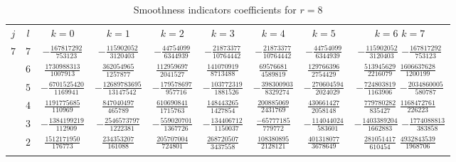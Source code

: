 \begin{table}
  \begin{center}
    \caption{Smoothness indicators coefficients for $r=8$}
    \label{tab:IS_8}
    \begin{tabular}{ccccccccc}
      \toprule
      $j$  &  $l$  &  $k=0$                            &  $k=1$                            &  $k=2$                            &  $k=3$                           &  $k=4$                           &  $k=5$                            &  $k=6$                            $k=7$                           \\ \addlinespace
      $7$  &  $7$  &  $-\frac{  167817292}{ 753123} $  &  $-\frac{  115902052}{ 3120403}$  &  $-\frac{  44754099}{ 6344939} $  &  $-\frac{  21873377}{10764442}$  &  $-\frac{  21873377}{10764442}$  &  $-\frac{  44754099}{ 6344939} $  &  $-\frac{  115902052}{ 3120403}$  $-\frac{  167817292}{ 753123}$  \\ \addlinespace
           &  $6$  &  $ \frac{ 1730988313}{1007913} $  &  $ \frac{  362054965}{ 1257877}$  &  $ \frac{ 112959697}{ 2041527} $  &  $ \frac{ 141070919}{ 8713488}$  &  $ \frac{  69576681}{ 4589819}$  &  $ \frac{ 129766396}{ 2754429} $  &  $ \frac{  513945629}{ 2216079}$  $ \frac{ 1606637628}{1200199}$  \\ \addlinespace
           &  $5$  &  $-\frac{ 6701525420}{1169941} $  &  $-\frac{12689783695}{13147542}$  &  $-\frac{ 179578697}{  957716} $  &  $-\frac{ 103772319}{ 1881526}$  &  $-\frac{ 398300903}{ 8329274}$  &  $-\frac{ 270604594}{ 2024029} $  &  $-\frac{  724803819}{ 1163906}$  $-\frac{ 2034860005}{ 580787}$  \\ \addlinespace
           &  $4$  &  $ \frac{ 1191775685}{ 110969} $  &  $ \frac{  847040497}{  465789}$  &  $ \frac{ 610690841}{ 1715763} $  &  $ \frac{ 148443265}{ 1427854}$  &  $ \frac{ 200885069}{ 2431769}$  &  $ \frac{ 430661427}{ 2058148} $  &  $ \frac{  779780282}{  835427}$  $ \frac{ 1168472761}{ 226223}$  \\ \addlinespace
           &  $3$  &  $-\frac{ 1384199219}{ 112909} $  &  $-\frac{ 2546573797}{ 1222381}$  &  $-\frac{ 559020701}{ 1367726} $  &  $-\frac{ 134406712}{ 1150037}$  &  $ \frac{ -65777185}{  779772}$  &  $-\frac{ 114044024}{  583601} $  &  $-\frac{ 1403389204}{ 1662883}$  $-\frac{ 1774088813}{ 383858}$  \\ \addlinespace
           &  $2$  &  $ \frac{ 1512171950}{ 176773} $  &  $ \frac{  234353207}{  161088}$  &  $ \frac{ 205707004}{  724801} $  &  $ \frac{ 268720507}{ 3437558}$  &  $ \frac{ 108380895}{ 2128121}$  &  $ \frac{ 401318077}{ 3678649} $  &  $ \frac{  281051417}{  610454}$  $ \frac{ 4932843539}{1968706}$  \\ \addlinespace

\end{tabular}
\end{center}
\end{table}
